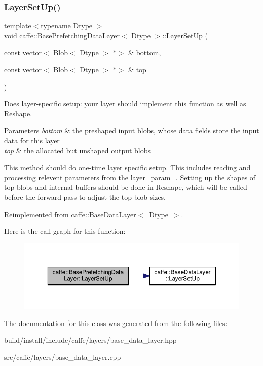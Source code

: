 \subsubsection{\texorpdfstring{Layer\+Set\+Up()}{LayerSetUp()}\hspace{0.1cm}{\footnotesize\ttfamily [2/2]}}
{\footnotesize\ttfamily template$<$typename Dtype $>$ \\
void \mbox{\hyperlink{classcaffe_1_1_base_prefetching_data_layer}{caffe\+::\+Base\+Prefetching\+Data\+Layer}}$<$ Dtype $>$\+::Layer\+Set\+Up (\begin{DoxyParamCaption}\item[{const vector$<$ \mbox{\hyperlink{classcaffe_1_1_blob}{Blob}}$<$ Dtype $>$ $\ast$$>$ \&}]{bottom,  }\item[{const vector$<$ \mbox{\hyperlink{classcaffe_1_1_blob}{Blob}}$<$ Dtype $>$ $\ast$$>$ \&}]{top }\end{DoxyParamCaption})\hspace{0.3cm}{\ttfamily [virtual]}}



Does layer-\/specific setup\+: your layer should implement this function as well as Reshape. 


\begin{DoxyParams}{Parameters}
{\em bottom} & the preshaped input blobs, whose data fields store the input data for this layer \\
\hline
{\em top} & the allocated but unshaped output blobs\\
\hline
\end{DoxyParams}
This method should do one-\/time layer specific setup. This includes reading and processing relevent parameters from the {\ttfamily layer\+\_\+param\+\_\+}. Setting up the shapes of top blobs and internal buffers should be done in {\ttfamily Reshape}, which will be called before the forward pass to adjust the top blob sizes. 

Reimplemented from \mbox{\hyperlink{classcaffe_1_1_base_data_layer_a7028919adf87326b808a2c7b21e8e927}{caffe\+::\+Base\+Data\+Layer$<$ Dtype $>$}}.

Here is the call graph for this function\+:
\nopagebreak
\begin{figure}[H]
\begin{center}
\leavevmode
\includegraphics[width=350pt]{classcaffe_1_1_base_prefetching_data_layer_ad3b7914abaa6d46c148864c0e28204ad_cgraph}
\end{center}
\end{figure}


The documentation for this class was generated from the following files\+:\begin{DoxyCompactItemize}
\item 
build/install/include/caffe/layers/base\+\_\+data\+\_\+layer.\+hpp\item 
src/caffe/layers/base\+\_\+data\+\_\+layer.\+cpp\end{DoxyCompactItemize}
